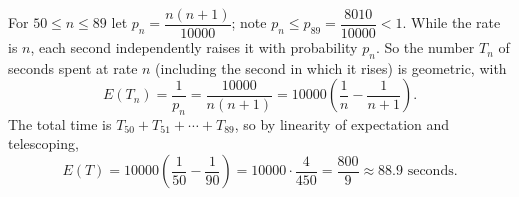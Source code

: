 For $50\le n\le89$ let $p_n=\dfrac{n(n+1)}{10000}$; note $p_n\le p_{89}=\dfrac{8010}{10000}<1$. While the rate is $n$, each second independently raises it with probability $p_n$. So the number $T_n$ of seconds spent at rate $n$ (including the second in which it rises) is geometric, with
\[E(T_n)=\dfrac{1}{p_n}=\dfrac{10000}{n(n+1)}=10000\left(\dfrac1n-\dfrac1{n+1}\right).\]
The total time is $T_{50}+T_{51}+\cdots+T_{89}$, so by linearity of expectation and telescoping,
\[E(T)=10000\left(\dfrac1{50}-\dfrac1{90}\right)=10000\cdot\dfrac{4}{450}=\boxed{\dfrac{800}{9}}\approx88.9\text{ seconds}.\]
